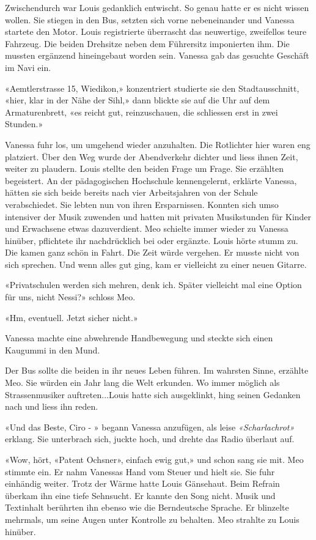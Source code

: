 Zwischendurch war Louis gedanklich entwischt. So genau hatte er es nicht wissen wollen. 
Sie stiegen in den Bus, setzten sich vorne nebeneinander und Vanessa
startete den Motor. Louis registrierte überrascht das neuwertige,
zweifellos teure Fahrzeug. Die beiden Drehsitze neben dem Führersitz imponierten ihm. 
Die mussten ergänzend hineingebaut worden sein.
Vanessa gab das gesuchte Geschäft im Navi ein.

«Aemtlerstrasse 15, Wiedikon,» konzentriert studierte sie den
Stadtausschnitt, «hier, klar in der Nähe der Sihl,» dann
blickte sie auf die Uhr auf dem Armaturenbrett, «es reicht gut,
reinzuschauen, die schliessen erst in zwei Stunden.»

Vanessa fuhr los, um umgehend wieder anzuhalten. Die Rotlichter hier waren eng platziert.
Über den Weg wurde der Abendverkehr dichter und liess ihnen Zeit,
weiter zu plaudern. Louis stellte den beiden Frage um Frage. Sie
erzählten begeistert.
An der pädagogischen Hochschule kennengelernt, erklärte Vanessa, hätten
sie sich beide bereits nach vier Arbeitsjahren von der Schule
verabschiedet. Sie lebten nun von ihren Ersparnissen. Konnten sich umso
intensiver der Musik zuwenden und hatten mit privaten Musikstunden für
Kinder und Erwachsene etwas dazuverdient.
Meo schielte immer wieder zu Vanessa hinüber, pflichtete ihr
nachdrücklich bei oder ergänzte.
Louis hörte stumm zu. Die kamen ganz schön in Fahrt. Die Zeit würde
vergehen. Er musste nicht von sich sprechen. Und wenn alles gut ging,
kam er vielleicht zu einer neuen Gitarre.

«Privatschulen werden sich mehren, denk ich. Später vielleicht mal eine
Option für uns, nicht Nessi?» schloss Meo.

«Hm, eventuell. Jetzt sicher nicht.»

Vanessa machte eine abwehrende Handbewegung und steckte sich einen Kaugummi in
den Mund.

Der Bus sollte die beiden in ihr neues Leben führen. Im wahrsten Sinne, erzählte 
Meo. Sie würden ein Jahr lang die Welt erkunden. Wo immer
möglich als Strassenmusiker auftreten...Louis hatte sich ausgeklinkt, hing seinen Gedanken nach und liess ihn reden. 

«Und das Beste, Ciro - » begann Vanessa anzufügen, als leise
\emph{«Scharlachrot»} erklang. Sie unterbrach sich, juckte hoch, und
drehte das Radio überlaut auf.

«Wow, hört, «Patent Ochsner», einfach ewig gut,» und schon sang
sie mit. Meo stimmte ein. Er nahm Vanessas Hand vom Steuer und hielt
sie. Sie fuhr einhändig weiter.
Trotz der Wärme hatte Louis Gänsehaut.
Beim Refrain überkam ihn eine tiefe Sehnsucht. Er kannte den Song nicht.
Musik und Textinhalt berührten ihn ebenso wie die Berndeutsche Sprache. Er
blinzelte mehrmals, um seine Augen unter Kontrolle zu behalten. Meo strahlte zu Louis hinüber.

